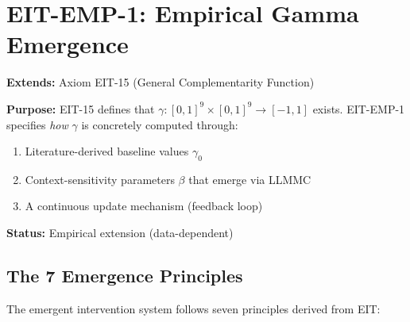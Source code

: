 %
%

\section{EIT-EMP-1: Empirical Gamma Emergence}
\label{sec:ie-emp1-gamma}

\begin{tcolorbox}[colback=purple!5!white, colframe=purple!75!black,
    title=\textbf{Empirical Extension EIT-EMP-1: Gamma Emergence Specification}]

\textbf{Extends:} Axiom EIT-15 (General Complementarity Function)

\textbf{Purpose:} EIT-15 defines that $\gamma: [0,1]^9 \times [0,1]^9 \rightarrow [-1,1]$ exists.
EIT-EMP-1 specifies \textit{how} $\gamma$ is concretely computed through:
\begin{enumerate}[nosep]
    \item Literature-derived baseline values $\gamma_0$
    \item Context-sensitivity parameters $\beta$ that emerge via LLMMC
    \item A continuous update mechanism (feedback loop)
\end{enumerate}

\textbf{Status:} Empirical extension (data-dependent)

\end{tcolorbox}

\subsection{The 7 Emergence Principles}
\label{subsec:emp1-principles}

The emergent intervention system follows seven principles derived from EIT:

